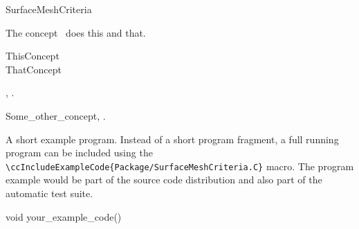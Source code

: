 

\begin{ccRefConcept}{SurfaceMeshCriteria}


\ccDefinition
  
The concept \ccRefName\ does this and that.

\ccGeneralizes

ThisConcept \\
ThatConcept

\ccTypes


\ccCreation
{}  %


\ccOperations


\ccHasModels

,
.

\ccSeeAlso

Some\_other\_concept,
.

\ccExample

A short example program.
Instead of a short program fragment, a full running program can be
included using the 
\verb|\ccIncludeExampleCode{Package/SurfaceMeshCriteria.C}| 
macro. The program example would be part of the source code distribution and
also part of the automatic test suite.

\begin{ccExampleCode}
void your_example_code() {
}
\end{ccExampleCode}


\end{ccRefConcept}


